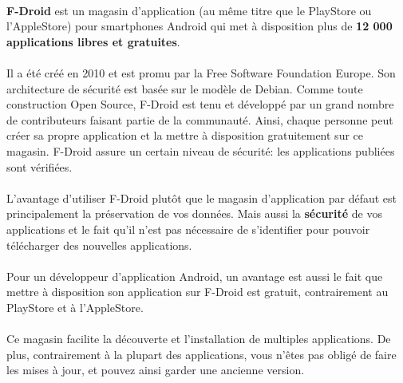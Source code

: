 \paragraph{} \textbf{F-Droid} est un magasin d'application (au même titre que
le PlayStore ou l'AppleStore) pour smartphones Android qui met à disposition
plus de \textbf{12 000 applications libres et gratuites}.

\paragraph{} Il a été créé en 2010 et est promu par la Free Software Foundation
Europe. Son architecture de sécurité est basée sur le modèle de Debian. Comme
toute construction Open Source, F-Droid est tenu et développé par un grand
nombre de contributeurs faisant partie de la communauté. Ainsi, chaque personne
peut créer sa propre application et la mettre à disposition gratuitement sur ce
magasin. F-Droid assure un certain niveau de sécurité: les applications
publiées sont vérifiées.

\paragraph{} L’avantage d'utiliser F-Droid plutôt que le magasin d'application
par défaut est principalement la préservation de vos données.  Mais aussi la
\textbf{sécurité} de vos applications et le fait qu'il n'est pas nécessaire de
s'identifier pour pouvoir télécharger des nouvelles applications.

\paragraph{} Pour un développeur d'application Android, un avantage est aussi
le fait que mettre à disposition son application sur F-Droid est gratuit,
contrairement au PlayStore et à l'AppleStore.

\paragraph{} Ce magasin facilite la découverte et l'installation de multiples
applications. De plus, contrairement à la plupart des applications, vous
n’êtes pas obligé de faire les mises à jour, et pouvez ainsi garder une
ancienne version.
